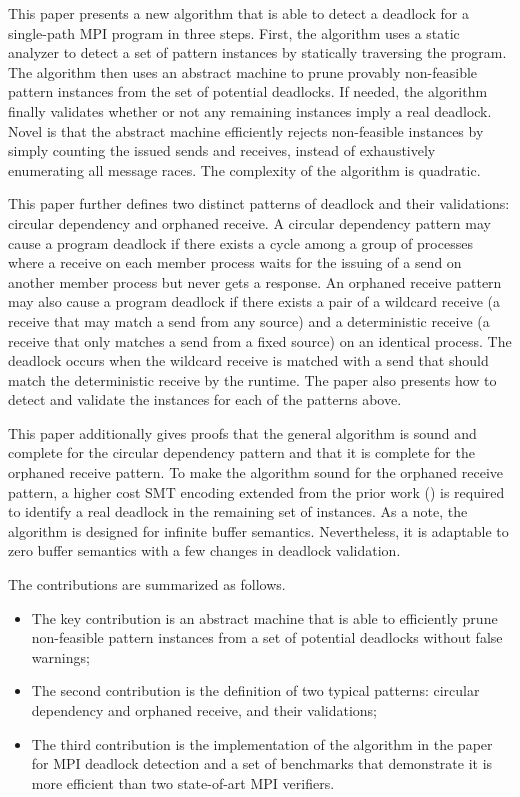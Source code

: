 This paper presents a new algorithm that is able to detect a deadlock for a single-path MPI program in three steps. First, the algorithm uses a static analyzer to detect a set of pattern instances by statically traversing the program. The algorithm then uses an abstract machine to prune provably non-feasible pattern instances from the set of potential deadlocks. If needed, the algorithm finally validates whether or not any remaining instances imply a real deadlock. Novel is that the abstract machine efficiently rejects non-feasible instances by simply counting the issued sends and receives, instead of exhaustively enumerating all message races. The complexity of the algorithm is quadratic. 

This paper further defines two distinct patterns of deadlock and their validations: circular dependency and orphaned receive. A circular dependency pattern may cause a program deadlock if there exists a cycle among a group of processes where a receive on each member process waits for the issuing of a send on another member process but never gets a response. An orphaned receive pattern may also cause a program deadlock if there exists a pair of a wildcard receive (a receive that may match a send from any source) and a deterministic receive (a receive that only matches a send from a fixed source) on an identical process. The deadlock occurs when the wildcard receive is matched with a send that should match the deterministic receive by the runtime. The paper also presents how to detect and validate the instances for each of the patterns above.

This paper additionally gives proofs that the general algorithm is sound and complete for the circular dependency pattern and that it is complete for the orphaned receive pattern. To make the algorithm sound for the orphaned receive pattern, a higher cost SMT encoding extended from the prior work (\cite{DBLP:conf/kbse/HuangMM13,HuangNFM15}) is required to identify a real deadlock in the remaining set of instances. As a note, the algorithm is designed for infinite buffer semantics. Nevertheless, it is adaptable to zero buffer semantics with a few changes in deadlock validation.

The contributions are summarized as follows.
\begin{itemize}
\item The key contribution is an abstract machine that is able to efficiently prune non-feasible pattern instances from a set of potential deadlocks without false warnings; 
\item The second contribution is the definition of two typical patterns: circular dependency and orphaned receive, and their validations;
\item The third contribution is the implementation of the algorithm in the paper for MPI deadlock detection and a set of benchmarks that demonstrate it is more efficient than two state-of-art MPI verifiers.
\end{itemize}

